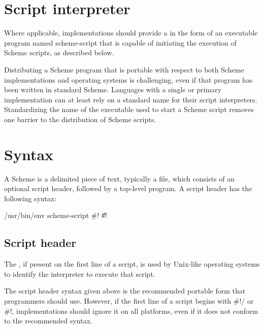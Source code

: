 \documentclass[twoside,twocolumn]{algol60}
\begin{document}
\section{Script interpreter}

Where applicable, implementations should provide a  in 
the form of an executable program named {\cf scheme-script} that is 
capable of initiating the execution of Scheme scripts, as described 
below.

\begin{rationale}
Distributing a Scheme program that is portable with respect to both 
Scheme implementations and operating systems is challenging, even 
if that program has been written in standard Scheme.  Languages with 
a single or primary implementation can at least rely on a standard 
name for their script interpreters.  Standardizing the name of the 
executable used to start a Scheme script removes one barrier to the 
distribution of Scheme scripts.
\end{rationale}

\section{Syntax}
\label{scriptsyntaxsection}

A Scheme  is a delimited piece of text, typically a
file, which consists of an optional script header, followed by a
top-level program.  A script header has the following syntax:
%
\begin{grammar}
 \:  /usr/bin/env  
  \> scheme-script 
 \: \#! \| \#! 
\end{grammar}

\subsection{Script header}

The , if present on the first line of a script,
is used by Unix-like operating systems to identify the interpreter to 
execute that script.

The script header syntax given above is the recommended portable 
form that programmers should use.  However, if the first line 
of a script begins with {\cf \#!/} or {\cf \#!}, 
implementations should ignore it on all platforms, even if it does not conform to 
the recommended syntax.  
\end{document}
